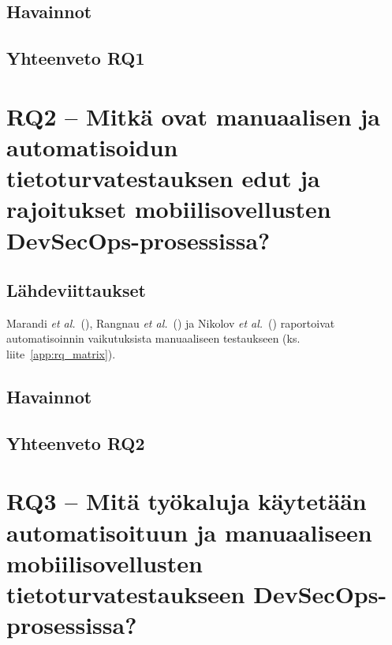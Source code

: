 \documentclass[bscthesis,finnish,oneside,biblatex]{uefcsthesis}
\begin{document}
\begin{description}
    \item[\cite{chung2024_devsecops}]
\end{description}

\subsection{Havainnot}

\subsection{Yhteenveto RQ1}

\section{RQ2 – Mitkä ovat manuaalisen ja automatisoidun tietoturvatestauksen edut ja rajoitukset mobiilisovellusten DevSecOps-prosessissa?}
\label{sec:rq2}

\subsection{Lähdeviittaukset}
Marandi \emph{et al.}\ (\citeyear{marandi2023_ias}),
Rangnau \emph{et al.}\ (\citeyear{putra2022_devsecops}) ja
Nikolov \emph{et al.}\ (\citeyear{rangnau2020_cst}) raportoivat automatisoinnin
vaikutuksista manuaaliseen testaukseen (ks. liite~\ref{app:rq_matrix}).

\subsection{Havainnot}

\subsection{Yhteenveto RQ2}

\section{RQ3 – Mitä työkaluja käytetään automatisoituun ja manuaaliseen mobiilisovellusten tietoturvatestaukseen DevSecOps-prosessissa?}
\label{sec:rq3}
\end{document}
